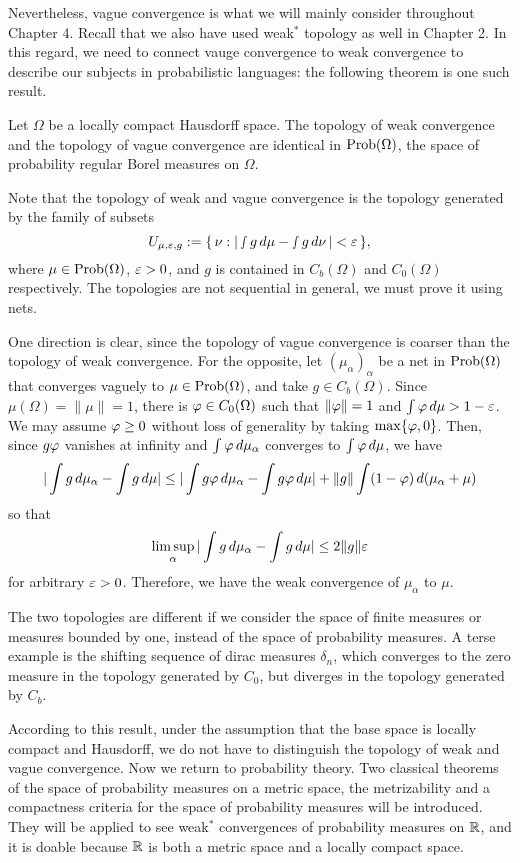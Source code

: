 \documentclass[a4paper]{article}
\begin{document}
Nevertheless, vague convergence is what we will mainly consider throughout Chapter 4.
Recall that we also have used weak$^*$ topology as well in Chapter 2.
In this regard, we need to connect vauge convergence to weak convergence to describe our subjects in probabilistic languages: the following theorem is one such result.

\begin{thm}
Let $\Omega$ be a locally compact Hausdorff space.
The topology of weak convergence and the topology of vague convergence are identical in $\operatorname{Prob}(\Omega)$, the space of probability regular Borel measures on $\Omega$.
\end{thm}

Note that the topology of weak and vague convergence is the topology generated by the family of subsets
\[U_{\mu,\varepsilon,g}:=\{\,\nu:|\smallint g\,d\mu-\smallint g\,d\nu\,|<\varepsilon\,\},\]
where $\mu\in\operatorname{Prob}(\Omega)$, $\varepsilon>0$, and $g$ is contained in $C_b(\Omega)$ and $C_0(\Omega)$ respectively.
The topologies are not sequential in general, we must prove it using nets.

\begin{pf}
One direction is clear, since the topology of vague convergence is coarser than the topology of weak convergence.
For the opposite, let $(\mu_\alpha)_\alpha$ be a net in $\operatorname{Prob}(\Omega)$ that converges vaguely to $\mu\in\operatorname{Prob}(\Omega)$, and take $g\in C_b(\Omega)$.
Since $\mu(\Omega)=\|\mu\|=1$, there is $\varphi\in C_0(\Omega)$ such that $\|\varphi\|=1$ and $\int\varphi\,d\mu>1-\varepsilon$.
We may assume $\varphi\ge0$ without loss of generality by taking $\max\{\varphi,0\}$.
Then, since $g\varphi$ vanishes at infinity and $\int\varphi\,d\mu_\alpha$ converges to $\int\varphi\,d\mu$, we have
\[|\int g\,d\mu_\alpha-\int g\,d\mu|\le|\int g\varphi\,d\mu_\alpha-\int g\varphi\,d\mu|+\|g\|\int(1-\varphi)\,d(\mu_\alpha+\mu)\]
so that
\[\limsup_\alpha|\int g\,d\mu_\alpha-\int g\,d\mu|\le2\|g\|\varepsilon\]
for arbitrary $\varepsilon>0$.
Therefore, we have the weak convergence of $\mu_\alpha$ to $\mu$.
\end{pf}
\begin{ex}
The two topologies are different if we consider the space of finite measures or measures bounded by one, instead of the space of probability measures.
A terse example is the shifting sequence of dirac measures $\delta_n$, which converges to the zero measure in the topology generated by $C_0$, but diverges in the topology generated by $C_b$.
\end{ex}

According to this result, under the assumption that the base space is locally compact and Hausdorff, we do not have to distinguish the topology of weak and vague convergence.
Now we return to probability theory.
Two classical theorems of the space of probability measures on a metric space, the metrizability and a compactness criteria for the space of probability measures will be introduced.
They will be applied to see weak$^*$ convergences of probability measures on $\mathbb{R}$, and it is doable because $\mathbb{R}$ is both a metric space and a locally compact space.
\end{document}
